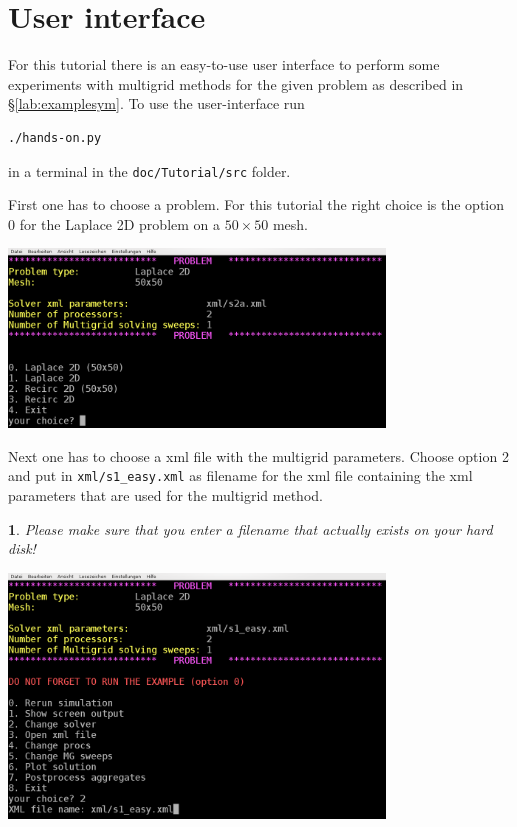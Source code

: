 \documentclass[10pt,fleqn]{book}
\newtheorem*{mycomment}{\ding{42}}
\begin{document}
\section{User interface}
For this tutorial there is an easy-to-use user interface to perform some experiments with multigrid methods for the given problem as described in \S\ref{lab:examplesym}.
To use the user-interface run
\begin{verbatim}
./hands-on.py
\end{verbatim}
in a terminal in the \texttt{doc/Tutorial/src} folder.

First one has to choose a problem. For this tutorial the right choice is the option 0 for the Laplace 2D problem on a $50\times 50$ mesh.
\begin{center}\includegraphics[width=10cm]{pics/tut1_1.png} \end{center}

Next one has to choose a xml file with the multigrid parameters. Choose option 2 and put in \texttt{xml/s1\_easy.xml} as filename for the xml file containing the xml parameters that are used for the multigrid method.
\begin{mycomment}
Please make sure that you enter a filename that actually exists on your hard disk!
\end{mycomment}

\begin{center}\includegraphics[width=10cm]{pics/tut1_3.png} \end{center}
\end{document}
